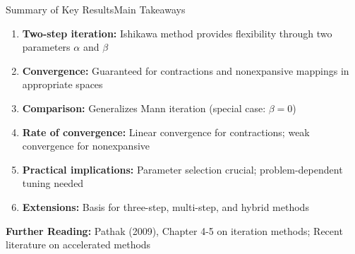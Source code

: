 \documentclass[aspectratio=169,10pt]{beamer}
\begin{document}
\begin{frame}{Summary of Key Results}{Main Takeaways}
\begin{enumerate}
    \item \textbf{Two-step iteration:} Ishikawa method provides flexibility through two parameters $\alpha$ and $\beta$

    \vspace{0.2cm}

    \item \textbf{Convergence:} Guaranteed for contractions and nonexpansive mappings in appropriate spaces

    \vspace{0.2cm}

    \item \textbf{Comparison:} Generalizes Mann iteration (special case: $\beta = 0$)

    \vspace{0.2cm}

    \item \textbf{Rate of convergence:} Linear convergence for contractions; weak convergence for nonexpansive

    \vspace{0.2cm}

    \item \textbf{Practical implications:} Parameter selection crucial; problem-dependent tuning needed

    \vspace{0.2cm}

    \item \textbf{Extensions:} Basis for three-step, multi-step, and hybrid methods
\end{enumerate}

\vspace{0.3cm}

\textbf{Further Reading:} Pathak (2009), Chapter 4-5 on iteration methods; Recent literature on accelerated methods
\end{frame}
\end{document}
